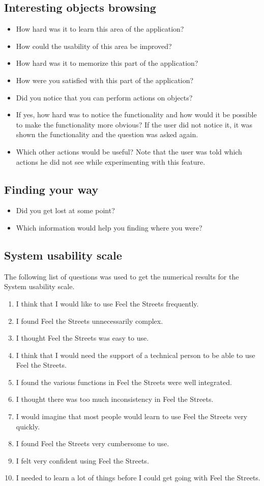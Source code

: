 \documentclass[nolof,digital]{fithesis3}
\begin{document}
\subsection{Interesting objects browsing}
\begin{itemize}
\item How hard was it to learn this area of the application?
\item How could the usability of this area be improved?
\item How hard was it to memorize this part of the application?
\item How were you satisfied with this part of the application?
\item Did you notice that you can perform actions on objects?
\item If yes, how hard was to notice the functionality and how would it be possible to make the functionality more obvious? If the user did not notice it, it was shown the functionality and the question was asked again.
\item Which other actions would be useful? Note that the user was told which actions he did not see while experimenting with this feature.
\end{itemize}
\subsection{Finding your way}
\begin{itemize}
\item Did you get lost at some point?
\item Which information would help you finding where you were?
\end{itemize}
\subsection{System usability scale}
The following list of questions was used to get the numerical results for the System usability scale.
\begin{enumerate}
\item I think that I would like to use Feel the Streets frequently.
\item I found Feel the Streets unnecessarily complex.
\item I thought Feel the Streets was easy to use.
\item I think that I would need the support of a technical person to be able to use Feel the Streets.
\item I found the various functions in Feel the Streets were well integrated.
\item I thought there was too much inconsistency in Feel the Streets.
\item I would imagine that most people would learn to use Feel the Streets very quickly.
\item I found Feel the Streets very cumbersome to use.
\item I felt very confident using Feel the Streets.
\item I needed to learn a lot of things before I could get going with Feel the Streets.
\end{enumerate}
\end{document}
